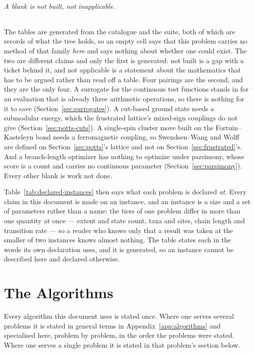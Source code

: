 \documentclass[11pt,a4paper]{article}
\begin{document}
\paragraph{A blank is not built, not inapplicable.}
The tables are generated from the catalogue and the suite, both of which are
records of what the tree holds, so an empty cell says that this problem
carries no method of that family \emph{here} and says nothing about whether
one could exist. The two are different claims and only the first is generated:
not built is a gap with a ticket behind it, and not applicable is a statement
about the mathematics that has to be argued rather than read off a table. Four
pairings are the second, and they are the only four. A surrogate for the
continuous test functions stands in for an evaluation that is already three
arithmetic operations, so there is nothing for it to save
(Section~\ref{sec:surrogates}). A cut-based ground state needs a submodular
energy, which the frustrated lattice's mixed-sign couplings do not give
(Section~\ref{sec:potts-cuts}). A single-spin cluster move built on the
Fortuin--Kasteleyn bond needs a ferromagnetic coupling, so Swendsen--Wang and
Wolff are defined on Section~\ref{sec:potts}'s lattice and not on
Section~\ref{sec:frustrated}'s. And a branch-length optimizer has nothing to
optimize under parsimony, whose score is a count and carries no continuous
parameter (Section~\ref{sec:parsimony}). Every other blank is work not done.

Table~\ref{tab:declared-instances} then says what each problem is declared
\emph{at}. Every claim in this document is made on an instance, and an
instance is a size and a set of parameters rather than a name: the tiers of one
problem differ in more than one quantity at once --- extent and state count,
taxa and sites, chain length and transition rate --- so a reader who knows only
that a result was taken at the smaller of two instances knows almost nothing.
The table states each in the words its own declaration uses, and it is
generated, so an instance cannot be described here and declared otherwise.



\part{The Algorithms}

Every algorithm this document uses is stated once. Where one serves several
problems it is stated in general terms in Appendix~\ref{app:algorithms} and
specialised here, problem by problem, in the order the problems were stated.
Where one serves a single problem it is stated in that problem's section
below.
\end{document}
